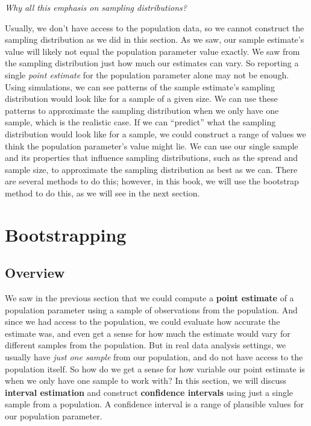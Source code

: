 \documentclass[
]{krantz}
\begin{document}
\emph{Why all this emphasis on sampling distributions?}

Usually, we don't have access to the population data, so we cannot construct the sampling distribution as we did in this section. As we saw, our sample estimate's value will likely not equal the population parameter value exactly. We saw from the sampling distribution just how much our estimates can vary. So reporting a single \emph{point estimate} for the population parameter alone may not be enough. Using simulations, we can see patterns of the sample estimate's sampling distribution would look like for a sample of a given size. We can use these patterns to approximate the sampling distribution when we only have one sample, which is the realistic case. If we can ``predict'' what the sampling distribution would look like for a sample, we could construct a range of values we think the population parameter's value might lie. We can use our single sample and its properties that influence sampling distributions, such as the spread and sample size, to approximate the sampling distribution as best as we can. There are several methods to do this; however, in this book, we will use the bootstrap method to do this, as we will see in the next section.

\hypertarget{bootstrapping}{%
\section{Bootstrapping}\label{bootstrapping}}

\hypertarget{overview-10}{%
\subsection{Overview}\label{overview-10}}

We saw in the previous section that we could compute a \textbf{point estimate} of a population
parameter using a sample of observations from the population. And since we had access to the
population, we could evaluate how accurate the estimate was, and even get a sense for how much
the estimate would vary for different samples from the population.
But in real data analysis settings, we usually have \emph{just one sample} from our population,
and do not have access to the population itself. So how do we get a sense for how
variable our point estimate is when we only have one sample to work with?
In this section, we will discuss \textbf{interval estimation} and construct \textbf{confidence intervals} using just a single sample from a population. A confidence interval is a range of plausible values for our population parameter.
\end{document}
